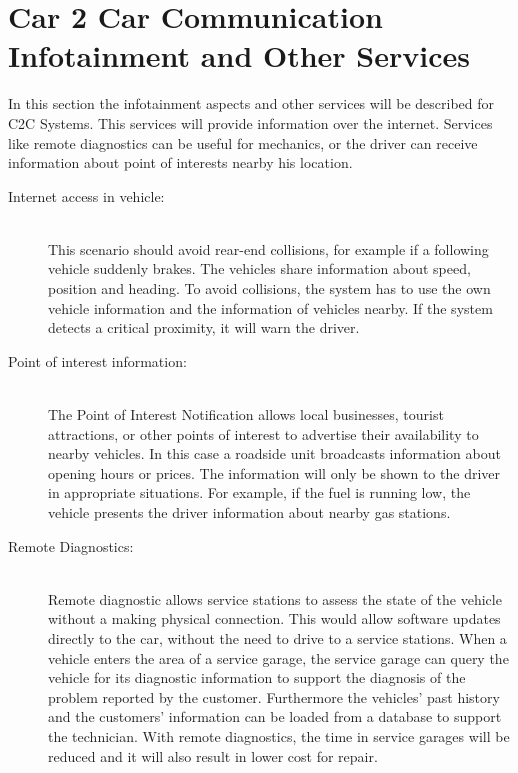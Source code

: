 \section{Car 2 Car Communication Infotainment and Other Services}
\label{sec:C2COtherServices}
In this section the infotainment aspects and other services will be described for C2C Systems. This services will provide information over the internet. Services like remote diagnostics can be useful for mechanics, or the driver can receive information about point of interests nearby his location.\\
\begin{description}
  \item[Internet access in vehicle:] \hfill \\ This scenario should avoid rear-end collisions, for example if a following vehicle suddenly brakes. The vehicles share information about speed, position and heading. To avoid collisions, the system has to use the own vehicle information and the information of vehicles nearby. If the system detects a critical proximity, it will warn the driver.
  \item[Point of interest information:] \hfill \\ The Point of Interest Notification allows local businesses, tourist attractions, or other points of interest to advertise their availability to nearby vehicles. In this case a roadside unit broadcasts information about opening hours or prices. The information will only be shown to the driver in appropriate situations. For example, if the fuel is running low, the vehicle presents the driver information about nearby gas stations.
  \item[Remote Diagnostics:] \hfill \\ Remote diagnostic allows service stations to assess the state of the vehicle without a making physical connection. This would allow software updates directly to the car, without the need to drive to a service stations. When a vehicle enters the area of a service garage, the 
service garage can query the vehicle for its diagnostic information to support the diagnosis of the problem reported by the customer. Furthermore the vehicles' past history and the customers' information can be loaded from a database to support the technician. With remote diagnostics, the time in service garages will be reduced and it will also result in lower cost for repair. 

\end{description}	